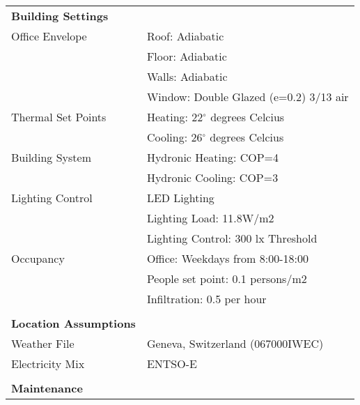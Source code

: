 \begin{description}
\begin{table}[H]
\centering
\begin{tabular}{ll}
\hline
\textbf{Building Settings}    &                                                \\
Office Envelope               & Roof: Adiabatic                                \\
                              & Floor: Adiabatic                               \\
                              & Walls: Adiabatic                               \\
                              & Window: Double Glazed (e=0.2) 3/13 air \\
Thermal Set Points            & Heating: 22$^{\circ}$ degrees Celcius          \\
                              & Cooling: 26$^{\circ}$ degrees Celcius          \\
Building System               & Hydronic Heating: COP=4                        \\
                              & Hydronic Cooling: COP=3                        \\
Lighting Control              & LED Lighting                                   \\
                              & Lighting Load: 11.8W/m2                        \\
                              & Lighting Control: 300 lx Threshold            \\
Occupancy                     & Office: Weekdays from 8:00-18:00               \\
                              & People set point: 0.1 persons/m2               \\
                              & Infiltration: 0.5 per hour                     \\
                              &                                                \\
\textbf{Location Assumptions} &                                                \\
Weather File                  & Geneva, Switzerland (067000IWEC)               \\
Electricity Mix               & ENTSO-E \cite{itten2012life}                   \\
                              &                                                \\
\textbf{Maintenance}          &                                                \\

\end{tabular}
\end{table}
\end{description}

